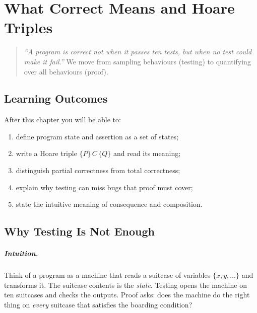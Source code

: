 \chapter{What Correct Means and Hoare Triples}
\label{ch:hoare-intro}

\begin{quote}
\emph{``A program is correct not when it passes ten tests, but when no test could make it fail.''} We move from sampling behaviours (testing) to quantifying over all behaviours (proof).
\end{quote}

\noindent{}
\vspace{0.4em}

\section*{Learning Outcomes}
After this chapter you will be able to:
\begin{enumerate}[label=(L\arabic*)]
    \item define program state and assertion as a set of states;
    \item write a Hoare triple $\{P\}\,C\,\{Q\}$ and read its meaning;
    \item distinguish partial correctness from total correctness;
    \item explain why testing can miss bugs that proof must cover;
    \item state the intuitive meaning of consequence and composition.
\end{enumerate}

\section{Why Testing Is Not Enough}
\label{sec:testing-vs-proof}
\paragraph{Intuition.} Think of a program as a machine that reads a suitcase of variables $\{x,y,\dots\}$ and transforms it. The suitcase contents is the \emph{state}. Testing opens the machine on ten suitcases and checks the outputs. Proof asks: does the machine do the right thing on \emph{every} suitcase that satisfies the boarding condition?

